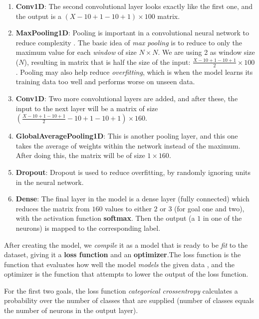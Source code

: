\begin{enumerate}
      \item \textbf{Conv1D}: The second convolutional layer looks exactly like the first one, and the output is a $(X-10+1-10+1) \times 100$ matrix. 
      \item \textbf{MaxPooling1D}: Pooling is important in a convolutional neural network to reduce complexity \cite{1d_cnn}. 
            The basic idea of \textit{max pooling} is to reduce to only the maximum value for each \textit{window} of size $N \times N$. We are using 2 as 
            window size ($N$), resulting in matrix that is half the size of the input: $ \frac{X-10+1-10+1}{2} \times 100$. 
            Pooling may also help reduce \textit{overfitting}, which is when the model learns its training data too well and performs worse on unseen data.
      \item \textbf{Conv1D}: Two more convolutional layers are added, and after these, the input to the next layer will be a matrix of size
            $ \left( \frac{X-10+1-10+1}{2}-10+1-10+1 \right) \times 160 $.
      \item \textbf{GlobalAveragePooling1D}: This is another pooling layer, and this one takes the average of weights within the network instead of the maximum.
            After doing this, the matrix will be of size $ 1 \times 160 $.
      \item \textbf{Dropout}: Dropout is used to reduce overfitting, by randomly ignoring units in the neural network. 
      \item \textbf{Dense}: The final layer in the model is a dense layer (fully connected) which reduces the matrix from $160$ values to 
            either $2$ or $3$ (for goal one and two), with the activation function \textbf{softmax}. 
            Then the output (a $1$ in one of the neurons) is mapped to the corresponding label.
\end{enumerate}

After creating the model, we \textit{compile} it as a model that is ready to be \textit{fit} to the dataset, 
giving it a \textbf{loss function} and an \textbf{optimizer}.The loss function is the function that evaluates how well the 
model \textit{models} the given data \cite{loss_functions}, and the optimizer is the function that attempts to lower the output of the loss function. 

For the first two goals, the loss function \textit{categorical crossentropy} calculates a probability over the 
number of classes that are supplied (number of classes equals the number of neurons in the output layer). 

